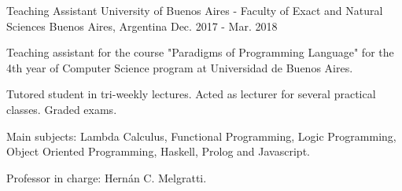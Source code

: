 

\begin{cventries}

\cventry
{Teaching Assistant} %
{University of Buenos Aires - Faculty of Exact and Natural Sciences} %
{Buenos Aires, Argentina} %
{Dec. 2017 - Mar. 2018} %
{
  \begin{cvitems} %
    \item Teaching assistant for the course "Paradigms of Programming Language" for the 4th year of Computer Science program at Universidad de Buenos Aires. 
    \item Tutored student in tri-weekly lectures. Acted as lecturer for several practical classes. Graded exams.
    \item Main subjects: Lambda Calculus, Functional Programming, Logic Programming, Object Oriented Programming, Haskell, Prolog and Javascript.
    \item Professor in charge: Hern\'an C. Melgratti.
  \end{cvitems}
}

\end{cventries}
